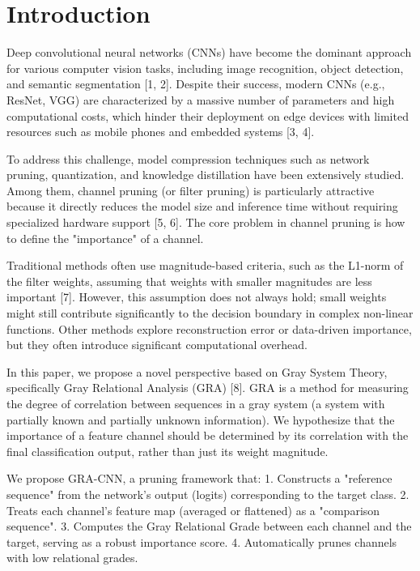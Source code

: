 \documentclass[sn-mathphys,Numbered]{sn-jnl}
\theoremstyle{thmstyleone}%
\theoremstyle{thmstyletwo}%
\theoremstyle{thmstylethree}%
\begin{document}

\maketitle

\section{Introduction}\label{sec1}
Deep convolutional neural networks (CNNs) have become the dominant approach for various computer vision tasks, including image recognition, object detection, and semantic segmentation [1, 2]. Despite their success, modern CNNs (e.g., ResNet, VGG) are characterized by a massive number of parameters and high computational costs, which hinder their deployment on edge devices with limited resources such as mobile phones and embedded systems [3, 4].

To address this challenge, model compression techniques such as network pruning, quantization, and knowledge distillation have been extensively studied. Among them, channel pruning (or filter pruning) is particularly attractive because it directly reduces the model size and inference time without requiring specialized hardware support [5, 6]. The core problem in channel pruning is how to define the "importance" of a channel. 

Traditional methods often use magnitude-based criteria, such as the L1-norm of the filter weights, assuming that weights with smaller magnitudes are less important [7]. However, this assumption does not always hold; small weights might still contribute significantly to the decision boundary in complex non-linear functions. Other methods explore reconstruction error or data-driven importance, but they often introduce significant computational overhead.

In this paper, we propose a novel perspective based on Gray System Theory, specifically Gray Relational Analysis (GRA) [8]. GRA is a method for measuring the degree of correlation between sequences in a gray system (a system with partially known and partially unknown information). We hypothesize that the importance of a feature channel should be determined by its correlation with the final classification output, rather than just its weight magnitude.

We propose GRA-CNN, a pruning framework that:
1.  Constructs a "reference sequence" from the network's output (logits) corresponding to the target class.
2.  Treats each channel's feature map (averaged or flattened) as a "comparison sequence".
3.  Computes the Gray Relational Grade between each channel and the target, serving as a robust importance score.
4.  Automatically prunes channels with low relational grades.
\end{document}
